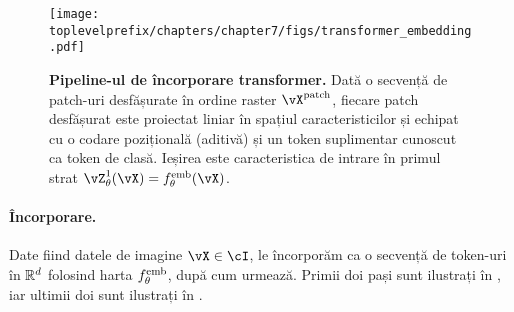\documentclass[../../book-main_ro.tex]{subfiles}
\begin{document}
\begin{figure}
    \centering 
    \texttt{[image: \\toplevelprefix/chapters/chapter7/figs/transformer\_embedding.pdf]}
    \caption{\small\textbf{Pipeline-ul de încorporare transformer.} Dată o secvență de patch-uri desfășurate în ordine raster \(\vX^{\patch}\), fiecare patch desfășurat este proiectat liniar în spațiul caracteristicilor și echipat cu o codare pozițională (aditivă) și un token suplimentar cunoscut ca token de clasă. Ieșirea este caracteristica de intrare în primul strat \(\vZ_{\theta}^{1}(\vX) = f_{\theta}^{\emb}(\vX)\).}
    \label{fig:transformer_embedding}
\end{figure}

\paragraph{Încorporare.} Date fiind datele de imagine \(\vX \in \cI\), le încorporăm ca o secvență de token-uri în \(\mathbb{R}^{d}\) folosind harta \(f_{\theta}^{\mathrm{emb}}\), după cum urmează. Primii doi pași sunt ilustrați în , iar ultimii doi sunt ilustrați în .
\end{document}
